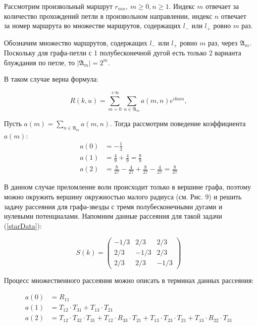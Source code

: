 \documentclass[a4 paper, 12 pt]{extarticle}
\begin{document}
   Рассмотрим произвольный маршрут $r_{mn}, \ m \geq 0, n \geq 1$.
   Индекс $m$ отвечает за количество прохождений петли в произвольном направлении, индекс $n$ отвечает за номер маршрута во множестве маршрутов, содержащих $l_-$ или $l_+$ ровно $m$ раз. 
   
   Обозначим множество маршрутов, содержащих $l_-$ или $l_+$ ровно $m$ раз, через $\mathfrak{A}_m$. Поскольку для графа-петли с 1 полубесконечной дугой есть только 2 варианта блуждания по петле, то $\left|\mathfrak{A}_m\right| = 2^m$.
   
   В таком случае верна формула:
   
   \begin{equation}
   \label{multiple}
   R\left(k,u\right) = \sum_{m = 0}^{+\infty} \sum_{n \in \mathfrak{A}_m} a\left(m,n\right)e^{ikam},
   \end{equation}

   Пусть $a\left(m\right) = \sum_{n \in \mathfrak{A}_m} a\left(m,n\right)$. Тогда рассмотрим поведение коэффициента $a\left(m\right)$:
   \[\begin{aligned}
   a(0) &= -\frac{1}{3} \\
   a(1) &= \frac{4}{9} + \frac{4}{9} = \frac{8}{9} \\
   a(2) &= \frac{8}{27} - \frac{4}{27} + \frac{8}{27} - \frac{4}{27} =  \frac{8}{27}
   \end{aligned}\]
   
   В данном случае преломление волн происходит только в вершине графа, поэтому можно окружить вершину окружностью малого радиуса (см. Рис. 9) и решить задачу рассеяния для графа-звезды с тремя полубесконечными дугами и нулевыми потенциалами. Напомним данные рассеяния для такой задачи (\ref{starData}):
   
   \[
   S(k)=
   \begin{pmatrix}
   -1/3 & 2/3 & 2/3 \\
   2/3 & -1/3 & 2/3 \\
   2/3 & 2/3 & -1/3 
   \end{pmatrix}\]
   
   Процесс множественного рассеяния можно описать в терминах данных рассеяния:
   
   \[
   \begin{aligned}
   a(0) &= R_{11} \\
   a(1) &= T_{12}\cdot T_{31} + T_{13}\cdot T_{21} \\
   a(2) &= T_{12}\cdot T_{32}\cdot T_{31} + T_{12} \cdot R_{33} \cdot T_{21} + T_{13} \cdot T_{23} \cdot T_{21} + T_{13} \cdot R_{22} \cdot T_{31}
   \end{aligned}\]
   
\end{document}
